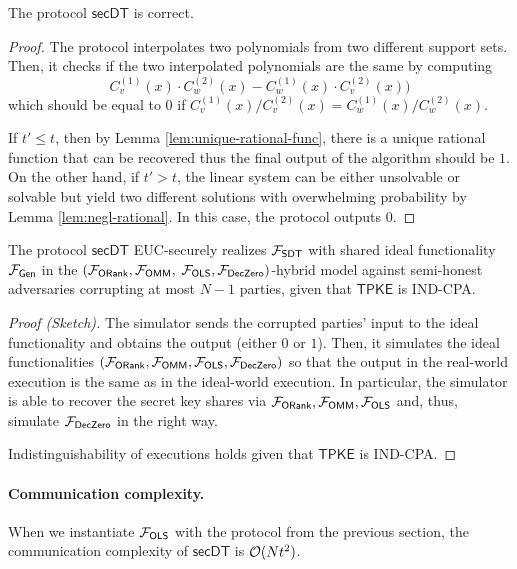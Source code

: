 \begin{theorem}[Correctness]
The protocol $\mathsf{secDT}$ is correct.
\end{theorem}{}
\begin{proof}
The protocol interpolates two polynomials from two different support sets. Then, it checks if the two interpolated polynomials are the same by computing  $$C_{v}^{(1)}(x)\cdot C_{w}^{(2)}(x)-C_{w}^{(1)}(x)\cdot C_{v}^{(2)}(x))$$ which should be equal to $0$ if $C_{v}^{(1)}(x)/ C_{v}^{(2)}(x)=C_{w}^{(1)}(x)/ C_{w}^{(2)}(x)$.

If $t'\leq t$, then by Lemma \ref{lem:unique-rational-func}, there is a unique rational function that can be recovered thus the final output of the algorithm should be $1$. 
%
On the other hand, if $t'>t$, the linear system can be either unsolvable or solvable but yield two different solutions with overwhelming probability by Lemma \ref{lem:negl-rational}. In this case, the protocol outputs $0$.
\end{proof}{}


\begin{theorem}
The protocol $\mathsf{secDT}$ EUC-securely realizes $\mathcal{F}_\mathsf{SDT}$ with shared ideal functionality $\mathcal{F}_\mathsf{Gen}$ in the $(\mathcal{F}_\mathsf{ORank},\mathcal{F}_\mathsf{OMM},$ $\mathcal{F}_\mathsf{OLS},\mathcal{F}_\mathsf{DecZero})$-hybrid model against semi-honest adversaries corrupting at most $N-1$ parties, given that $\mathsf{TPKE}$ is IND-CPA.
\end{theorem}{}

\begin{proof}[Proof (Sketch)]
 The simulator sends the corrupted parties' input to the ideal functionality and obtains the output (either $0$ or $1$). Then, it simulates the ideal functionalities $(\mathcal{F}_\mathsf{ORank},\mathcal{F}_\mathsf{OMM},\mathcal{F}_\mathsf{OLS},\mathcal{F}_\mathsf{DecZero})$ so that the output in the real-world execution is the same as in the ideal-world execution. In particular, the simulator is able to recover the secret key shares via $\mathcal{F}_\mathsf{ORank},\mathcal{F}_\mathsf{OMM},\mathcal{F}_\mathsf{OLS}$ and, thus, simulate $\mathcal{F}_\mathsf{DecZero}$ in the right way. 

Indistinguishability of executions holds given that $\mathsf{TPKE}$ is IND-CPA. 
\end{proof}{}


\paragraph{Communication complexity.}
When we instantiate $\mathcal{F}_\mathsf{OLS}$ with the protocol from the previous section, the communication complexity of $\mathsf{secDT}$ is $\mathcal{O}(Nt^2)$.

